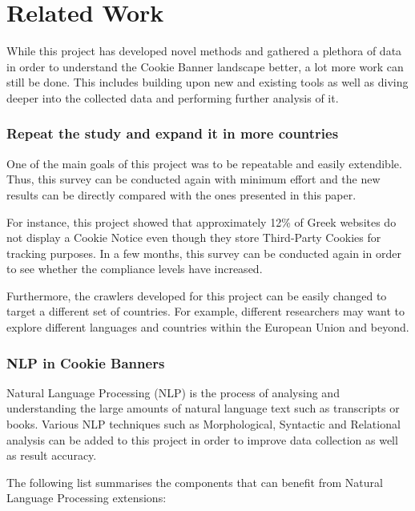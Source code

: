 \documentclass[../main.tex]{subfiles}
\begin{document}
\section{Related Work}
While this project has developed novel methods and gathered a plethora of data in order to understand the Cookie Banner landscape better, a lot more work can still be done. This includes building upon new and existing tools as well as diving deeper into the collected data and performing further analysis of it.

\subsubsection{Repeat the study and expand it in more countries}
One of the main goals of this project was to be repeatable and easily extendible. Thus, this survey can be conducted again with minimum effort and the new results can be directly compared with the ones presented in this paper. 

For instance, this project showed that approximately 12\% of Greek websites do not display a Cookie Notice even though they store Third-Party Cookies for tracking purposes. In a few months, this survey can be conducted again in order to see whether the compliance levels have increased. 

Furthermore, the crawlers developed for this project can be easily changed to target a different set of countries. For example, different researchers may want to explore different languages and countries within the European Union and beyond.

\subsubsection{NLP in Cookie Banners}
Natural Language Processing (NLP) is the process of analysing and understanding the large amounts of natural language text such as transcripts or books. Various NLP techniques such as Morphological, Syntactic and Relational analysis \cite{manning2014stanford} can be added to this project in order to improve data collection as well as result accuracy. 

The following list summarises the components that can benefit from Natural Language Processing extensions:
\end{document}
